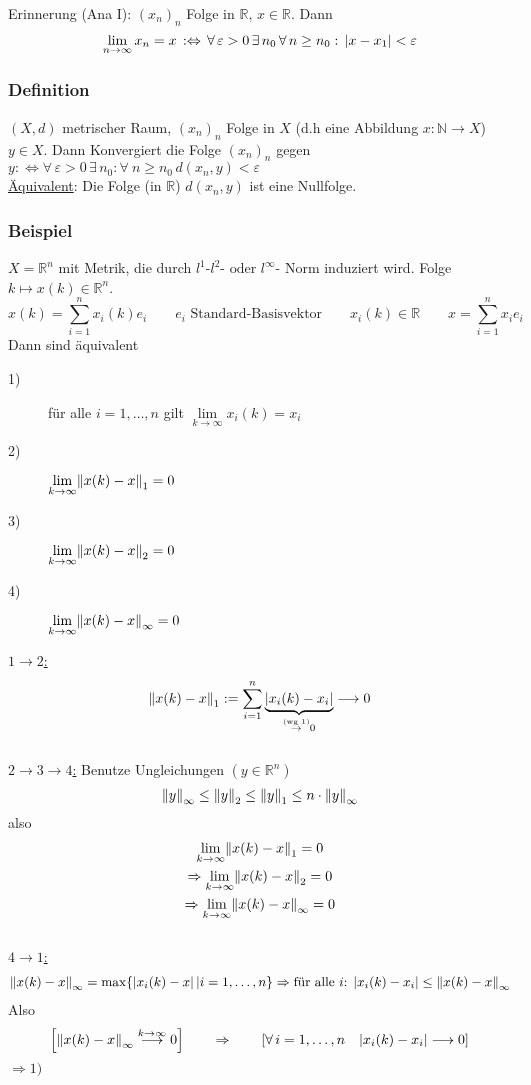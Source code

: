 Erinnerung (Ana I): $(x_n)_n$ Folge in $\mathbb{R}$, $x \in  \mathbb{R}$. Dann 
\[
\lim_{n \to \infty}x_n=x \, :\Leftrightarrow \, \forall\, \varepsilon > 0 \,\exists \,n_0 \, \forall\, n \geq n_0: \, \lvert x-x_1\rvert< \varepsilon
 \] 
\subsubsection{Definition} %
\label{ssub:definition}
$(X,d)$ metrischer Raum, $(x_n)_n$ Folge in $X$ (d.h eine Abbildung $x: \mathbb{N} \to X$) $y \in X$. Dann Konvergiert die Folge $(x_n)_n$ gegen $y :\Leftrightarrow 
 \forall\, \varepsilon >0 \, \exists \, n_0: \forall \ n \geq n_0 \, d(x_n,y)< \varepsilon $ \\
\underline{Äquivalent}: Die Folge (in $\mathbb{R}$) $d(x_n,y)$ ist eine Nullfolge.

\subsubsection{Beispiel} %
\label{ssub:3.4}
$X=\mathbb{R}^n$ mit Metrik, die durch $l^1$-$ l^2$-$ \text{ oder } l^{\infty}$- Norm induziert wird. Folge $k \mapsto x(k) \in \mathbb{R}^n$.
\[
	x(k)= \sum_{i=1}^{n}x_i(k)e_i \qquad e_i \text{ Standard-Basisvektor} \qquad x_i(k) \in  \mathbb{R} \qquad x=\sum^{n}_{i=1}x_ie_i
\]
Dann sind äquivalent
\begin{description}
	\item[1)] für alle $i=1,\dots,n$ gilt $\lim\limits_{k \to \infty}x_i(k)=x_i$
	\item[2)] $\lim\limits_{k \to \infty}\norm{x(k)-x}_1=0$
	\item[3)] $\lim\limits_{k \to \infty}\norm{x(k)-x}_2=0$
	\item[4)] $\lim\limits_{k \to \infty}\norm{x(k)-x}_{\infty}=0$ 
\end{description}
\underline{$1 \to 2$:} 
\[
	\norm{x(k)-x}_1:=\sum^{n}_{i=1}\underset{\stackrel{\text{(wg 1)}}{\to}0}{\underbrace{\abs{x_i(k)-x_i}}} \longrightarrow 0
\]
\\
\underline{$2 \to 3 \to 4$:} Benutze Ungleichungen $(y \in \mathbb{R}^n)$
\[
	\norm{y}_{\infty} \leq \norm{y}_2 \leq \norm{y}_1 \leq n \cdot \norm{y}_{\infty}
\]
also 
\begin{gather*}
	\lim_{k \to \infty}\norm{x(k)-x}_1=0 \\
	\Rightarrow \lim_{k \to \infty}\norm{x(k)-x}_2=0 \\
	\Rightarrow \lim_{k \to \infty}\norm{x(k)-x}_{\infty}=0
\end{gather*}
\\
\underline{$4 \to 1$:} \begin{gather*}
	\norm{x(k)-x}_{\infty} = \max\{ \abs{x_i(k)-x} \,| i=1,\dots,n \}
	\Rightarrow \text{für alle $i$: } \abs{x_i(k)-x_i} \leq \norm{x(k)-x}_{\infty}
\end{gather*}
Also
\[
	\left[ \norm{x(k)-x}_{\infty} \stackrel{k \to \infty}{\longrightarrow}0 \right] \qquad \Rightarrow \qquad \left[ \forall\, i=1,\dots,n \quad \abs{x_i(k)-x_i} \longrightarrow 0 \right]
\]
$\Rightarrow 1)$ \bewende

